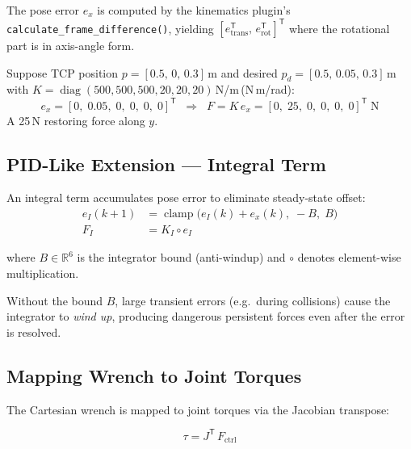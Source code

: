 \documentclass[11pt,a4paper]{article}
\newcommand{\R}{\mathbb{R}}
\newcommand{\tr}{\mathsf{T}}
\newcommand{\diag}{\operatorname{diag}}
\newcommand{\clamp}{\operatorname{clamp}}
\newcommand{\odot}{\circ}  %
\begin{document}
The pose error $e_x$ is computed by the kinematics plugin's
\texttt{calculate\_frame\_difference()}, yielding
$[e_{\text{trans}}^\tr,\, e_{\text{rot}}^\tr]^\tr$ where the rotational part is
in axis-angle form.

\begin{examplebox}
Suppose TCP position $p = [0.5,\,0,\,0.3]$\,m and desired
$p_d = [0.5,\,0.05,\,0.3]$\,m with
$K = \diag(500,500,500,20,20,20)$\,N/m\,(N\,m/rad):
\[
  e_x = [0,\; 0.05,\; 0,\; 0,\; 0,\; 0]^\tr
  \;\;\Longrightarrow\;\;
  F = K\,e_x = [0,\; 25,\; 0,\; 0,\; 0,\; 0]^\tr\;\text{N}
\]
A 25\,N restoring force along $y$.
\end{examplebox}

\subsection{PID-Like Extension --- Integral Term}
\label{sec:integral}

An integral term accumulates pose error to eliminate steady-state offset:
\begin{align}
  e_I(k\!+\!1) &= \clamp\!\bigl(e_I(k) + e_x(k),\; -B,\; B\bigr)
  \label{eq:integrator_update} \\[4pt]
  F_I &= K_I \odot e_I
  \label{eq:integrator_force}
\end{align}

where $B \in \R^6$ is the integrator bound (anti-windup) and $\odot$ denotes
element-wise multiplication.

\begin{reasonbox}
Without the bound $B$, large transient errors (e.g.\ during collisions) cause
the integrator to \emph{wind up}, producing dangerous persistent forces even
after the error is resolved.
\end{reasonbox}

\subsection{Mapping Wrench to Joint Torques}
\label{sec:JT}

The Cartesian wrench is mapped to joint torques via the Jacobian transpose:

\begin{keqbox}
\begin{equation}
  \tau = J^\tr\, F_{\text{ctrl}}
  \label{eq:JT}
\end{equation}
\end{keqbox}
\end{document}
